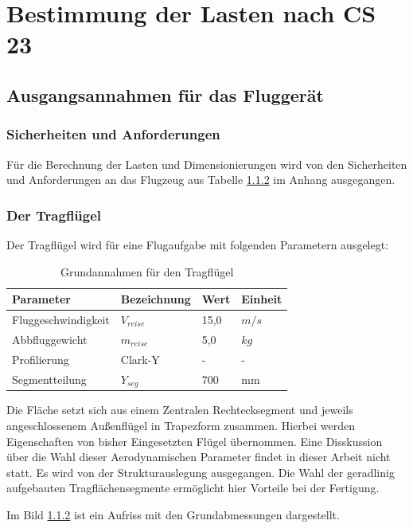 \chapter{Bestimmung der Lasten nach CS 23}\label{cha:Bestimmung der Lasten nach CS 23}

\section{Ausgangsannahmen für das Fluggerät}

\subsection{Sicherheiten und Anforderungen}

Für die Berechnung der Lasten und Dimensionierungen wird von den Sicherheiten und Anforderungen an das Flugzeug aus Tabelle \ref{} im Anhang ausgegangen.

\subsection{Der Tragflügel}

Der Tragflügel wird für eine Flugaufgabe mit folgenden Parametern ausgelegt:

\begin{table}[h]
\centering
\begin{tabular}{|l|l|l|l|}
\hline
Parameter  & Bezeichnung &  Wert & Einheit \\ \hline
Fluggeschwindigkeit  & $V_{reise}$ & 15,0 & $m/s$\\ \hline
Abbfluggewicht & $m_{reise}$  & 5,0 & $kg$\\ \hline
Profilierung & Clark-Y & - & - \\ \hline
Segmentteilung & $Y_{seg}$ & 700 & mm\\ \hline
\end{tabular}
\caption{Grundannahmen für den Tragflügel}
\label{tab:Grundannahmen für den Tragflügel}
\end{table}
Die Fläche setzt sich aus einem Zentralen Rechtecksegment und jeweils angeschlossenem Außenflügel 
in Trapezform zusammen.
Hierbei werden Eigenschaften von bisher Eingesetzten Flügel übernommen.
Eine Disskussion über die Wahl dieser Aerodynamischen Parameter findet in dieser Arbeit nicht statt. 
Es wird von der Strukturauslegung ausgegangen.
Die Wahl der geradlinig aufgebauten Tragflächensegmente ermöglicht hier Vorteile bei der Fertigung.

Im Bild \ref{} ist ein Aufriss mit den Grundabmessungen dargestellt.

